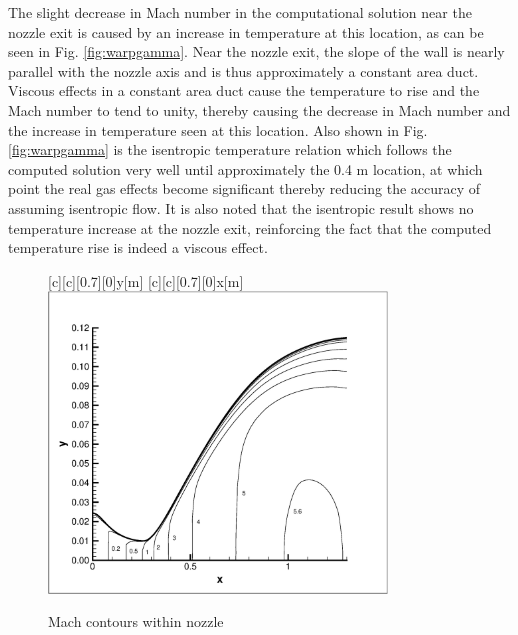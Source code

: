 	The slight decrease in Mach number in the computational solution near the nozzle exit is caused 
by an increase in temperature at this location, as can be seen in Fig. \ref{fig:warpgamma}.  
Near the nozzle exit, the slope of the wall is nearly parallel with the nozzle axis and is thus approximately
a constant area duct.  Viscous effects in a constant area duct cause the temperature to rise and the Mach number
to tend to unity, thereby causing the decrease in Mach number and the increase in temperature seen at this
location.  Also shown in Fig. \ref{fig:warpgamma} is the isentropic temperature relation which follows the computed solution
very well until approximately the 0.4 m location, at which point the real gas effects become significant thereby
reducing the accuracy of assuming isentropic flow.  It is also noted that the isentropic result shows no temperature
increase at the nozzle exit, reinforcing the fact that the computed temperature rise is indeed a viscous 
effect.  

\begin{figure}[p]
\begin{center}
[c][c][0.7][0]{y[m]}
[c][c][0.7][0]{x[m]}
\includegraphics[width=9cm]{warpmachcont.eps}
\caption{Mach contours within nozzle}
\label{fig:warpmach}
\end{center}
\end{figure}

